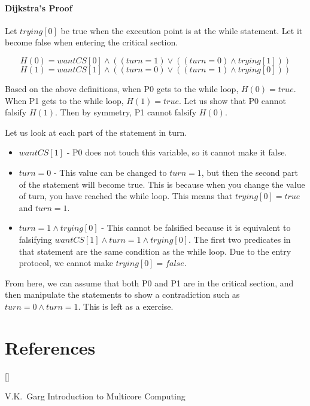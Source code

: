 \documentclass[twoside]{article}
\def\beginrefs{\begin{list}%
        {[\arabic{equation}]}{\usecounter{equation}
         \setlength{\leftmargin}{2.0truecm}\setlength{\labelsep}{0.4truecm}%
         \setlength{\labelwidth}{1.6truecm}}}
\def\endrefs{\end{list}}
\def\bibentry#1{\item[\hbox{[#1]}]}
\begin{document}
\paragraph{Dijkstra's Proof}
Let $trying[0]$ be true when the execution point is at the while statement. Let it become false when entering the critical section.

$$H(0) = wantCS[0] \land ((turn = 1) \lor ((turn = 0) \land trying[1]))$$
$$H(1) = wantCS[1] \land ((turn = 0) \lor ((turn = 1) \land trying[0]))$$

Based on the above definitions, when P0 gets to the while loop, $H(0) = true$. When P1 gets to the while loop, $H(1) = true$. Let us show that P0 cannot falsify $H(1)$. Then by symmetry, P1 cannot falsify $H(0)$.

Let us look at each part of the statement in turn.
\begin{itemize}
 \item $wantCS[1]$ - P0 does not touch this variable, so it cannot make it false.
 \item $turn = 0$ - This value can be changed to $turn = 1$, but then the second part of the statement will become true. This is because when you change the value of turn, you have reached the while loop. This means that $trying[0] = true$ and $turn = 1$.
 \item $turn = 1 \land trying[0]$ - This cannot be falsified because it is equivalent to falsifying $wantCS[1] \land turn = 1 \land trying[0]$. The first two predicates in that statement are the same condition as the while loop. Due to the entry protocol, we cannot make $trying[0] = false$.
\end{itemize}

From here, we can assume that both P0 and P1 are in the critical section, and then manipulate the statements to show a contradiction such as $turn = 0 \land turn = 1$. This is left as a exercise.

\section*{References}
\beginrefs
\bibentry{1}{\sc V.K.~Garg}
Introduction to Multicore Computing
\endrefs
\end{document}
